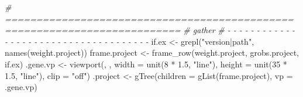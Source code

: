 \documentclass[
]{article}
\newenvironment{Shaded}{\begin{snugshade}}{\end{snugshade}}
\newcommand{\AttributeTok}[1]{\textcolor[rgb]{0.77,0.63,0.00}{#1}}
\newcommand{\CommentTok}[1]{\textcolor[rgb]{0.56,0.35,0.01}{\textit{#1}}}
\newcommand{\DecValTok}[1]{\textcolor[rgb]{0.00,0.00,0.81}{#1}}
\newcommand{\DocumentationTok}[1]{\textcolor[rgb]{0.56,0.35,0.01}{\textbf{\textit{#1}}}}
\newcommand{\FloatTok}[1]{\textcolor[rgb]{0.00,0.00,0.81}{#1}}
\newcommand{\FunctionTok}[1]{\textcolor[rgb]{0.00,0.00,0.00}{#1}}
\newcommand{\NormalTok}[1]{#1}
\newcommand{\OtherTok}[1]{\textcolor[rgb]{0.56,0.35,0.01}{#1}}
\newcommand{\SpecialCharTok}[1]{\textcolor[rgb]{0.00,0.00,0.00}{#1}}
\newcommand{\StringTok}[1]{\textcolor[rgb]{0.31,0.60,0.02}{#1}}
\begin{document}
\begin{Shaded}
\end{Shaded}

\begin{Shaded}
\begin{Highlighting}[]
\CommentTok{\# ==========================================================================}
\CommentTok{\# gather}
\CommentTok{\# {-} {-} {-} {-} {-} {-} {-} {-} {-} {-} {-} {-} {-} {-} {-} {-} {-} {-} {-} {-} {-} {-} {-} {-} {-} {-} {-} {-} {-} {-} {-} {-} {-} {-} {-} {-} {-}}
\NormalTok{if.ex }\OtherTok{\textless{}{-}} \FunctionTok{grepl}\NormalTok{(}\StringTok{"version|path"}\NormalTok{, }\FunctionTok{names}\NormalTok{(weight.project))}
\NormalTok{frame.project }\OtherTok{\textless{}{-}} \FunctionTok{frame\_row}\NormalTok{(weight.project, grobs.project, if.ex)}
\NormalTok{.gene.vp }\OtherTok{\textless{}{-}} \FunctionTok{viewport}\NormalTok{(, , }\AttributeTok{width =} \FunctionTok{unit}\NormalTok{(}\DecValTok{8} \SpecialCharTok{*} \FloatTok{1.5}\NormalTok{, }\StringTok{"line"}\NormalTok{),}
                     \AttributeTok{height =} \FunctionTok{unit}\NormalTok{(}\DecValTok{35} \SpecialCharTok{*} \FloatTok{1.5}\NormalTok{, }\StringTok{"line"}\NormalTok{), }\AttributeTok{clip =} \StringTok{"off"}\NormalTok{)}
\NormalTok{.project }\OtherTok{\textless{}{-}} \FunctionTok{gTree}\NormalTok{(}\AttributeTok{children =} \FunctionTok{gList}\NormalTok{(frame.project), }\AttributeTok{vp =}\NormalTok{ .gene.vp)}
\end{Highlighting}
\end{Shaded}
\end{document}
